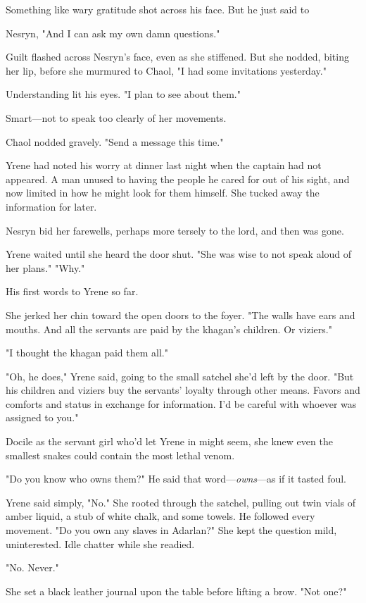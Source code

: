 Something like wary gratitude shot across his face. But he just said to

Nesryn, "And I can ask my own damn questions."

Guilt flashed across Nesryn's face, even as she stiffened. But she nodded, biting her lip, before she murmured to Chaol, "I had some invitations yesterday."

Understanding lit his eyes. "I plan to see about them."

Smart---not to speak too clearly of her movements.

Chaol nodded gravely. "Send a message this time."

Yrene had noted his worry at dinner last night when the captain had not appeared. A man unused to having the people he cared for out of his sight, and now limited in how he might look for them himself. She tucked away the information for later.

Nesryn bid her farewells, perhaps more tersely to the lord, and then was gone.

Yrene waited until she heard the door shut. "She was wise to not speak aloud of her plans." "Why."

His first words to Yrene so far.

She jerked her chin toward the open doors to the foyer. "The walls have ears and mouths. And all the servants are paid by the khagan's children. Or viziers."

"I thought the khagan paid them all."

"Oh, he does," Yrene said, going to the small satchel she'd left by the door. "But his children and viziers buy the servants' loyalty through other means. Favors and comforts and status in exchange for information. I'd be careful with whoever was assigned to you."

Docile as the servant girl who'd let Yrene in might seem, she knew even the smallest snakes could contain the most lethal venom.

"Do you know who  owns them?" He said that word---\emph{owns}---as if it tasted foul.

Yrene said simply, "No." She rooted through the satchel, pulling out twin vials of amber liquid, a stub of white chalk, and some towels. He followed every movement. "Do you own any slaves in Adarlan?" She kept the question mild, uninterested. Idle chatter while she readied.

"No. Never."

She set a black leather journal upon the table before lifting a brow. "Not one?"

